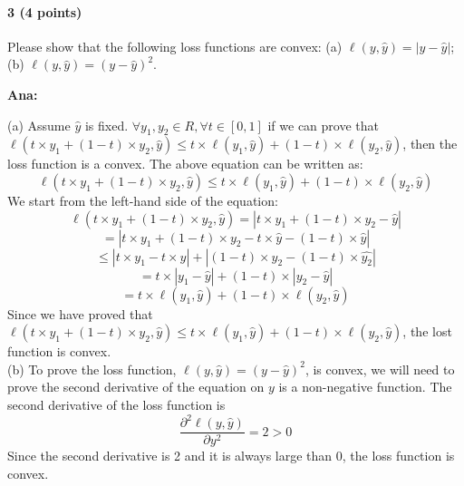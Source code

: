 \documentclass[11pt]{article}
\begin{document}
\paragraph{3 (4 points)} Please show that the following loss functions are convex: (a) $\ell (y, \hat{y}) = |y-\hat{y}|$; (b) $\ell (y, \hat{y}) = (y-\hat{y})^2$.

\noindent
\textbf{Ana:}

\noindent
(a) Assume $\hat{y} $ is fixed. $\forall y_1, y_2 \in R, \forall t \in [0,1]$ if we can prove that $\ell (t \times y_1 + (1-t) \times y_2, \hat{y}) \leq t \times \ell (y_1, \hat{y}) + (1-t) \times \ell (y_2, \hat{y})$,  then the loss function is a convex. The above equation can be written as:
$$\ell (t \times y_1 + (1-t) \times y_2, \hat{y}) \leq t \times \ell (y_1, \hat{y}) + (1-t) \times \ell (y_2, \hat{y})$$
We start from the left-hand side of the equation:
$$\ell (t \times y_1 + (1-t) \times y_2, \hat{y}) = | t \times y_1 + (1-t) \times y_2 - \hat{y} |$$
$$= | t \times y_1 + (1-t) \times y_2 - t \times \hat{y} - (1-t) \times \hat{y} |$$
$$\leq |t \times y_1 - t \times \hat{y}| + |(1-t) \times y_2 - (1-t) \times \hat{y_2}|$$
$$= t \times |y_1 - \hat{y}| + (1-t) \times |y_2 - \hat{y}|$$
$$= t \times \ell(y_1, \hat{y}) + (1-t) \times \ell(y_2, \hat{y})$$
Since we have proved that $\ell (t \times y_1 + (1-t) \times y_2, \hat{y}) \leq t \times \ell (y_1, \hat{y}) + (1-t) \times \ell (y_2, \hat{y})$, the lost function is convex.\\

\noindent
(b) To prove the loss function, $\ell (y, \hat{y}) = (y-\hat{y})^2$, is convex, we will need to prove the second derivative of the equation on $y$ is a non-negative function. 
The second derivative of the loss function is 
$$\frac{\partial^2 \ell(y, \hat{y})}{\partial y^2} = 2 > 0$$
Since the second derivative is 2 and it is always large than 0, the loss function is convex.



\end{document}
